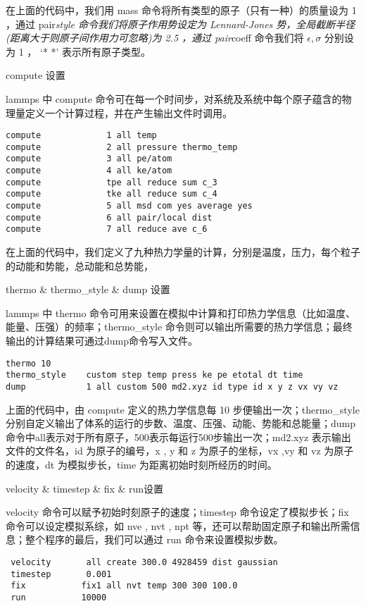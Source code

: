 \documentclass[
]{article}
\begin{document}
在上面的代码中，我们用 mass 命令将所有类型的原子（只有一种）的质量设为 1
，通过 pair\emph{style 命令我们将原子作用势设定为 Lennard-Jones
势，全局截断半径(距离大于则原子间作用力可忽略)为 2.5 ，通过 pair}coeff
命令我们将 \(\epsilon, \sigma\) 分别设为 1 ， `* *' 表示所有原子类型。

compute 设置

lammps 中 compute
命令可在每一个时间步，对系统及系统中每个原子蕴含的物理量定义一个计算过程，并在产生输出文件时调用。

\begin{verbatim}
compute				1 all temp
compute				2 all pressure thermo_temp
compute				3 all pe/atom
compute				4 all ke/atom
compute				tpe all reduce sum c_3
compute				tke all reduce sum c_4
compute				5 all msd com yes average yes
compute				6 all pair/local dist
compute				7 all reduce ave c_6
\end{verbatim}

在上面的代码中，我们定义了九种热力学量的计算，分别是温度，压力，每个粒子的动能和势能，总动能和总势能，

thermo \& thermo\_style \& dump 设置

lammps 中 thermo
命令可用来设置在模拟中计算和打印热力学信息（比如温度、能量、压强）的频率；thermo\_style
命令则可以输出所需要的热力学信息；最终输出的计算结果可通过dump命令写入文件。

\begin{verbatim}
thermo 10
thermo_style   	custom step temp press ke pe etotal dt time
dump          	1 all custom 500 md2.xyz id type id x y z vx vy vz
\end{verbatim}

上面的代码中，由 compute 定义的热力学信息每 10
步便输出一次；thermo\_style
分别自定义输出了体系的运行的步数、温度、压强、动能、势能和总能量；dump
命令中all表示对于所有原子，500表示每运行500步输出一次；md2.xyz
表示输出文件的文件名，id 为原子的编号，x , y 和 z 为原子的坐标，vx ,vy
和 vz 为原子的速度，dt 为模拟步长，time 为距离初始时刻所经历的时间。

velocity \& timestep \& fix \& run设置

velocity 命令可以赋予初始时刻原子的速度；timestep
命令设定了模拟步长；fix 命令可以设定模拟系综，如 nve , nvt , npt
等，还可以帮助固定原子和输出所需信息；整个程序的最后，我们可以通过 run
命令来设置模拟步数。

\begin{verbatim}
 velocity    	all create 300.0 4928459 dist gaussian
 timestep    	0.001
 fix		   fix1 all nvt temp 300 300 100.0
 run  		   10000
\end{verbatim}
\end{document}
